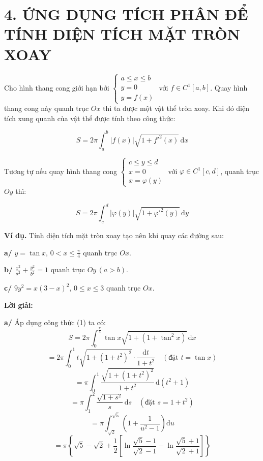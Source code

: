 \section*{4. ỨNG DỤNG TÍCH PHÂN ĐỂ TÍNH DIỆN TÍCH MẶT TRÒN XOAY}

Cho hình thang cong giới hạn bởi 
$\begin{cases} 
a \le x \le b \\ 
y = 0 \\ 
y = f(x) 
\end{cases}$ 
với $f \in C^1[a, b]$. Quay hình thang cong này quanh trục $Ox$ thì ta được một vật thể tròn xoay. Khi đó diện tích xung quanh của vật thể được tính theo công thức:

\begin{equation}
S = 2\pi \int_{a}^{b} |f(x)| \sqrt{1 + f'^2(x)} \, \mathrm{d}x
\end{equation}

Tương tự nếu quay hình thang cong 
$\begin{cases} 
c \le y \le d \\ 
x = 0 \\ 
x = \varphi(y) 
\end{cases}$ 
với $\varphi \in C^1[c, d]$, quanh trục $Oy$ thì:

\begin{equation}
S = 2\pi \int_{c}^{d} |\varphi(y)| \sqrt{1 + \varphi'^2(y)} \, \mathrm{d}y
\end{equation}

\bigskip

\noindent\textbf{Ví dụ.} Tính diện tích mặt tròn xoay tạo nên khi quay các đường sau:

\noindent\textbf{a/} $y = \tan x, \, 0 < x \le \frac{\pi}{4}$ quanh trục $Ox$.

\noindent\textbf{b/} $\frac{x^2}{a^2} + \frac{y^2}{b^2} = 1$ quanh trục $Oy \, (a > b)$.

\noindent\textbf{c/} $9y^2 = x(3 - x)^2, \, 0 \le x \le 3$ quanh trục $Ox$.

\bigskip

\noindent\textbf{Lời giải:}

\noindent\textbf{a/} Áp dụng công thức (1) ta có:
\[
S = 2\pi \int_{0}^{\frac{\pi}{4}} \tan x \sqrt{1 + (1 + \tan^2 x)} \, \mathrm{d}x
\]
\[
= 2\pi \int_{0}^{1} t \sqrt{1 + (1 + t^2)^2} \cdot \frac{\mathrm{d}t}{1 + t^2} \quad (\text{đặt } t = \tan x)
\]
\[
= \pi \int_{0}^{1} \frac{\sqrt{1 + (1 + t^2)^2}}{1 + t^2} \, \mathrm{d}(t^2 + 1)
\]
\[
= \pi \int_{1}^{2} \frac{\sqrt{1 + s^2}}{s} \, \mathrm{d}s \quad (\text{đặt } s = 1 + t^2)
\]
\[
= \pi \int_{\sqrt{2}}^{\sqrt{5}} \left(1 + \frac{1}{u^2 - 1}\right) \mathrm{d}u
\]
\[
= \pi \left\{ \sqrt{5} - \sqrt{2} + \frac{1}{2} \left[ \ln \frac{\sqrt{5} - 1}{\sqrt{2} - 1} - \ln \frac{\sqrt{5} + 1}{\sqrt{2} + 1} \right] \right\}
\]


